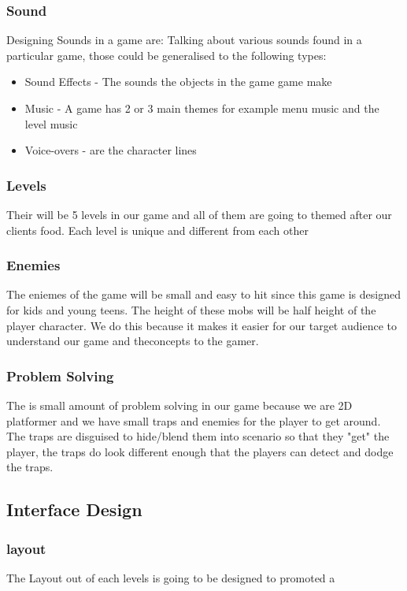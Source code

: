 \documentclass{article}
\begin{document}
\subsubsection{Sound}
Designing Sounds in a game are:
Talking about various sounds found in a particular game, those could be generalised to the following types: 
\begin{itemize}
	\item Sound Effects - The sounds the objects in the game game make
	\item Music -  A game has 2 or 3 main themes for example menu music and the level music
	\item Voice-overs - are the character lines
\end{itemize}

\subsubsection{Levels}
Their will be 5 levels in our game and all of them are going to themed after our clients food. Each level is unique and different from each other 

\subsubsection{Enemies}
The eniemes of the game will be small and easy to hit since this game is designed for kids and young teens. The height of these mobs will be half height of the player character. We do this because it makes it easier for our target audience to understand our game and theconcepts to the gamer. 


\subsubsection{Problem Solving}
The is small amount of problem solving in our game because we are 2D platformer and we have small traps and enemies for the player to get around. The traps are disguised to hide/blend them into scenario so that they "get" the player, the traps do look different enough that the players can detect and dodge the traps.

\subsection{Interface Design}
\subsubsection{layout}
The Layout out of each levels is going to be designed to promoted a 
\end{document}
